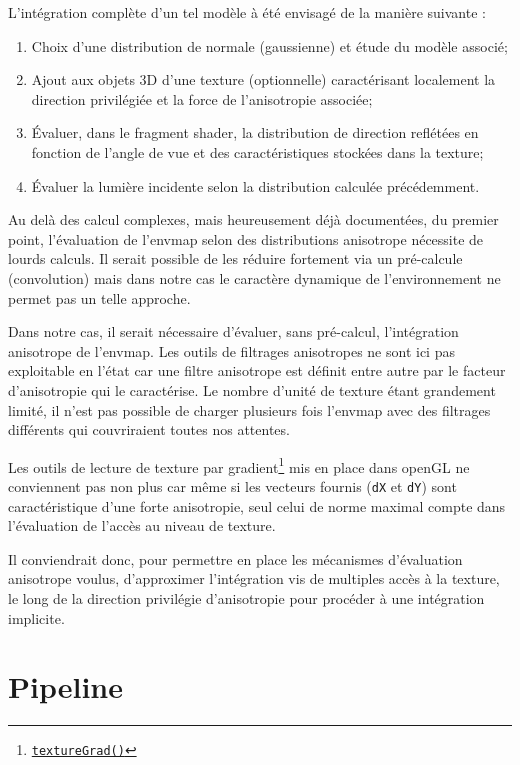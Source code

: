 \documentclass[10pt,a4paper,twoside, twocolumn]{report}
\begin{document}
L’intégration complète d'un tel modèle à été envisagé de la manière suivante :
\begin{enumerate}
	\item Choix d'une distribution de normale (gaussienne) et étude du modèle associé;
	\item Ajout aux objets 3D d'une texture (optionnelle) caractérisant localement la direction privilégiée et la force de l'anisotropie associée;
	\item Évaluer, dans le fragment shader, la distribution de direction reflétées en fonction de l'angle de vue et des caractéristiques stockées dans la texture;
	\item Évaluer la lumière incidente selon la distribution calculée précédemment.
\end{enumerate}

Au delà des calcul complexes, mais heureusement déjà documentées, du premier point\cite{Heitz2013a}, l'évaluation de l'envmap selon des distributions anisotrope nécessite de lourds calculs.
Il serait possible de les réduire fortement via un pré-calcule (convolution) mais dans notre cas le caractère dynamique de l'environnement ne permet pas un telle approche.

Dans notre cas, il serait nécessaire d'évaluer, sans pré-calcul, l’intégration anisotrope de l'envmap.
Les outils de filtrages anisotropes ne sont ici pas exploitable en l’état car une filtre anisotrope est définit entre autre par le facteur d'anisotropie qui le caractérise. Le nombre d'unité de texture étant grandement limité, il n'est pas possible de charger plusieurs fois l'envmap avec des filtrages différents qui couvriraient toutes nos attentes.

Les outils de lecture de texture par gradient\footnote{\href{https://www.opengl.org/sdk/docs/man/html/textureGrad.xhtml}{\texttt{textureGrad()}}} mis en place dans openGL ne conviennent pas non plus car même si les vecteurs fournis (\texttt{dX} et \texttt{dY}) sont caractéristique d'une forte anisotropie, seul celui de norme maximal compte dans l'évaluation de l’accès au niveau de texture. 

Il conviendrait donc, pour permettre en place les mécanismes d'évaluation anisotrope voulus, d'approximer l’intégration vis de multiples accès à la texture, le long de la direction privilégie d’anisotropie pour procéder à une intégration implicite.


\section{Pipeline}
\end{document}
